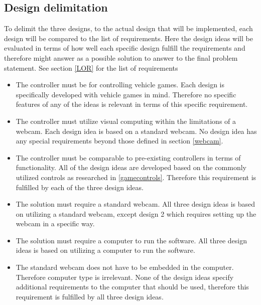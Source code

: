 \subsection{Design delimitation}

To delimit the three designs, to the actual design that will be implemented, each design will be compared to the list of requirements. Here the design ideas will be evaluated in terms of how well each specific design fulfill the requirements and therefore might answer as a possible solution to answer to the final problem statement. See section \ref{LOR} for the list of requirements

\begin{itemize}
\item The controller must be for controlling vehicle games.\newline
Each design is specifically developed with vehicle games in mind. Therefore no specific features of any of the ideas is relevant in terms of this specific requirement.

\item The controller must utilize visual computing within the limitations of a webcam.\newline
Each design idea is based on a standard webcam. No design idea has any special requirements beyond those defined in section \ref{webcam}. 

\item The controller must be comparable to pre-existing controllers in terms of functionality.\newline
All of the design ideas are developed based on the commonly utilized controls as researched in \ref{gamecontrols}. Therefore this requirement is fulfilled by each of the three design ideas.

\item The solution must require a standard webcam.\newline
All three design ideas is based on utilizing a standard webcam, except design 2 which requires setting up the webcam in a specific way.

\item The solution must require a computer to run the software.\newline
All three design ideas is based on utilizing a computer to run the software.

\item The standard webcam does not have to be embedded in the computer. Therefore computer type is irrelevant.\newline
None of the design ideas specify additional requirements to the computer that should be used, therefore this requirement is fulfilled by all three design ideas.


\end{itemize}

